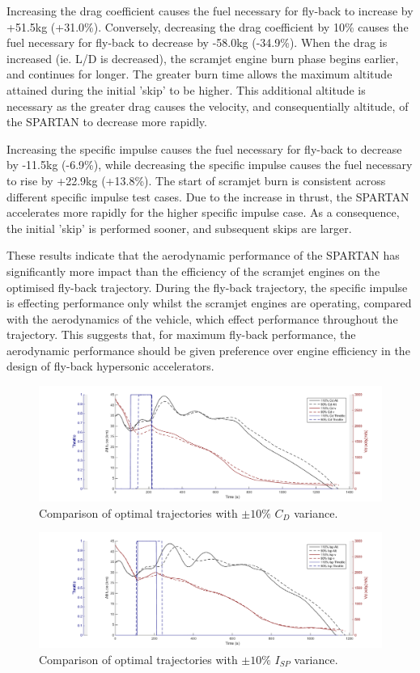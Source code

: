\documentclass[journal]{new-aiaa} %
\begin{document}
 Increasing the drag coefficient causes the fuel necessary for fly-back to increase by +51.5kg (+31.0\%). Conversely, decreasing the drag coefficient by 10\% causes the fuel necessary for  fly-back to decrease by -58.0kg (-34.9\%). 
 When the drag is increased (ie. L/D is decreased), the scramjet engine burn phase begins earlier, and continues for longer. 
 The greater burn time allows the maximum altitude attained during the initial 'skip' to be higher. 
 This additional altitude is necessary as the greater drag causes the velocity, and consequentially altitude, of the SPARTAN to decrease more rapidly.


Increasing the specific impulse causes the fuel necessary for fly-back to decrease by -11.5kg (-6.9\%), while decreasing the specific impulse causes the fuel necessary to rise by +22.9kg (+13.8\%). The start of scramjet burn is consistent across different specific impulse test cases. Due to the increase in thrust, the SPARTAN accelerates more rapidly for the higher specific impulse case. As a consequence, the initial 'skip' is performed sooner, and subsequent skips are larger. 

These results indicate that the aerodynamic performance of the SPARTAN has significantly more impact than the efficiency of the scramjet engines on the optimised fly-back trajectory. During the fly-back trajectory, the specific impulse is effecting performance only whilst the scramjet engines are operating, compared with the aerodynamics of the vehicle, which effect performance throughout the trajectory. This suggests that, for maximum fly-back performance, the aerodynamic performance should be given preference over engine efficiency in the design of fly-back hypersonic accelerators. 

\begin{figure}[ht]
\centering
\includegraphics[width=0.9\linewidth]{Figures/CdVariation}
\caption{Comparison of optimal trajectories with $\pm10\%$ $C_D$ variance.}
\label{fig:CdVariation}
\end{figure}

\begin{figure}[ht]
\centering
\includegraphics[width=0.9\linewidth]{Figures/IspVariation}
\caption{Comparison of optimal trajectories with $\pm10\%$ $I_{SP}$ variance.}
\label{fig:IspVariation}
\end{figure}
\end{document}
